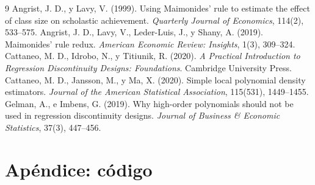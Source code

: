 \documentclass[11pt,a4paper]{article}
\begin{document}
\begin{thebibliography}{9}
 Angrist, J. D., y Lavy, V. (1999). Using Maimonides' rule to estimate the effect of class size on scholastic achievement. \textit{Quarterly Journal of Economics}, 114(2), 533--575.
 Angrist, J. D., Lavy, V., Leder-Luis, J., y Shany, A. (2019). Maimonides' rule redux. \textit{American Economic Review: Insights}, 1(3), 309--324.
 Cattaneo, M. D., Idrobo, N., y Titiunik, R. (2020). \textit{A Practical Introduction to Regression Discontinuity Designs: Foundations}. Cambridge University Press.
 Cattaneo, M. D., Jansson, M., y Ma, X. (2020). Simple local polynomial density estimators. \textit{Journal of the American Statistical Association}, 115(531), 1449--1455.
 Gelman, A., e Imbens, G. (2019). Why high-order polynomials should not be used in regression discontinuity designs. \textit{Journal of Business \& Economic Statistics}, 37(3), 447--456.
\end{thebibliography}

\newpage
\appendix
\section*{Apéndice: código}

\end{document}
